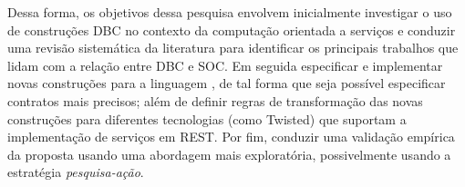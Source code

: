 Dessa forma, os objetivos dessa pesquisa envolvem inicialmente investigar o uso
de construções DBC no contexto da computação orientada a serviços e conduzir uma
revisão sistemática da literatura para identificar os principais trabalhos que
lidam com a relação entre DBC e SOC. Em seguida especificar e implementar novas
construções para a linguagem \neoidl, de tal forma que seja possível especificar
contratos mais precisos; além de definir regras de transformação das novas
construções \neoidl para diferentes tecnologias (como Twisted) que suportam a
implementação de serviços em REST.
Por fim, conduzir uma validação empírica da proposta usando uma abordagem mais
exploratória, possivelmente usando a estratégia \emph{pesquisa-ação}.


